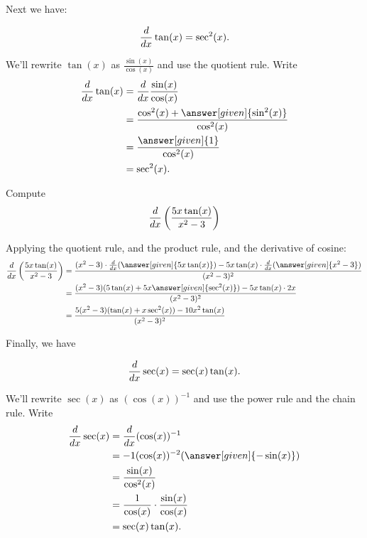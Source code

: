 \documentclass{ximera}
\begin{document}
Next we have:

\begin{theorem}
\[
\frac{d}{dx} \tan(x) = \sec^2(x).
\]

\begin{explanation}
We'll rewrite $\tan(x)$ as $\frac{\sin(x)}{\cos(x)}$ and use the quotient rule. Write
\begin{align*}
\ddx\tan(x) &= \ddx\frac{\sin(x)}{\cos(x)}\\
&=\frac{\cos^2(x) + \answer[given]{\sin^2(x)}}{\cos^2(x)}\\
&=\frac{\answer[given]{1}}{\cos^2(x)}\\
&=\sec^2(x).
\end{align*}
\end{explanation}
\end{theorem}

\begin{example}
Compute
\[
\frac{d}{dx} \left( \frac{5x \tan(x)}{x^2 - 3} \right)
\]
\begin{explanation}
Applying the quotient rule, and the product rule, and the derivative
of cosine:
\begin{align*}
\ddx \left( \frac{5x \tan(x)}{x^2 - 3} \right) &= \frac{(x^2 - 3) \cdot \ddx(\answer[given]{5x \tan(x)}) - 5x \tan(x) \cdot \ddx (\answer[given]{x^2 - 3})}{(x^2 - 3)^2}  \\
&= \frac{(x^2 - 3)(5 \tan(x) + 5x \answer[given]{\sec^2(x)}) - 5x \tan(x) \cdot 2x}{(x^2 - 3)^2}  \\
&= \frac{5(x^2-3)(\tan(x)+x \sec^2(x)) - 10x^2 \tan(x)}{(x^2-3)^2}
\end{align*}
\end{explanation}
\end{example}

Finally, we have

\begin{theorem}
\[
\frac{d}{dx} \sec(x) = \sec(x)\tan(x).
\]


\begin{explanation}
We'll rewrite $\sec(x)$ as $(\cos(x))^{-1}$ and use the power rule and the chain rule. Write
\begin{align*}
\ddx \sec(x) &= \ddx(\cos (x))^{-1}\\
&=-1(\cos(x))^{-2}(\answer[given]{-\sin(x)}) \\
&= \frac{\sin(x)}{\cos^2(x)} \\
&= \frac{1}{\cos(x)} \cdot \frac{\sin(x)}{\cos(x)}  \\
&= \sec(x)\tan(x).
\end{align*}
\end{explanation}
\end{theorem}
\end{document}
